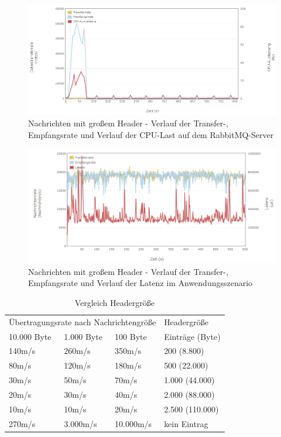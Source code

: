 \documentclass[	a4paper,
			11pt,
			oneside,
			parskip]{scrartcl}
\begin{document}
		\begin{figure}[!htb]
			\centering
			\includegraphics[width=\textwidth]{img/header/header_server2.png}
			\caption{Nachrichten mit großem Header - Verlauf der Transfer-, Empfangsrate und Verlauf der CPU-Last auf dem RabbitMQ-Server}
			\label{fig:header-server2}
		\end{figure}
		
		\begin{figure}[!htb]
			\centering
			\includegraphics[width=\textwidth]{img/header/header.png}
			\caption{Nachrichten mit großem Header - Verlauf der Transfer-, Empfangsrate und Verlauf der Latenz im Anwendungsszenario}
			\label{fig:header-scenario}
		\end{figure}
				
		\begin{table}[!htb]
			\centering
			\begin{tabular}{p{3cm}ll|p{3cm}}
				\multicolumn{3}{l|}{Übertragungsrate nach Nachrichtengröße}  & Headergröße     \\
				10.000 Byte          & 1.000 Byte              & 100 Byte    & Einträge (Byte) \\ \hline
				140m/s               & 260m/s                  & 350m/s      & 200 (8.800)     \\
				80m/s                & 120m/s                  & 180m/s      & 500 (22.000)    \\
				30m/s                & 50m/s                   & 70m/s       & 1.000 (44.000)  \\
				20m/s                & 30m/s                   & 40m/s       & 2.000 (88.000)  \\
				10m/s                & 10m/s                   & 20m/s       & 2.500 (110.000) \\ \hline
				270m/s               & 3.000m/s                & 10.000m/s   & kein Eintrag
			\end{tabular}
			\caption{Vergleich Headergröße}
		\end{table}
	
\end{document}
